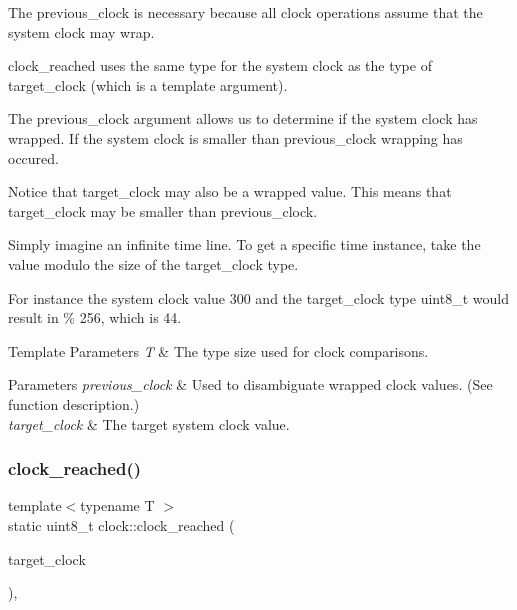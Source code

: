 The previous\+\_\+clock is necessary because all clock operations assume that the system clock may wrap.

clock\+\_\+reached uses the same type for the system clock as the type of target\+\_\+clock (which is a template argument).

The previous\+\_\+clock argument allows us to determine if the system clock has wrapped. If the system clock is smaller than previous\+\_\+clock wrapping has occured.

Notice that target\+\_\+clock may also be a wrapped value. This means that target\+\_\+clock may be smaller than previous\+\_\+clock.

Simply imagine an infinite time line. To get a specific time instance, take the value modulo the size of the target\+\_\+clock type.

For instance the system clock value 300 and the target\+\_\+clock type uint8\+\_\+t would result in { \% 256}, which is 44.


\begin{DoxyTemplParams}{Template Parameters}
{\em T} & The type size used for clock comparisons. \\
\hline
\end{DoxyTemplParams}

\begin{DoxyParams}{Parameters}
{\em previous\+\_\+clock} & Used to disambiguate wrapped clock values. (See function description.) \\
\hline
{\em target\+\_\+clock} & The target system clock value. \\
\hline
\end{DoxyParams}
\hypertarget{namespaceclock_a240d81de9119f92701aa5f26555972c4}{}\label{namespaceclock_a240d81de9119f92701aa5f26555972c4} 
\subsubsection{\texorpdfstring{clock\+\_\+reached()}{clock\_reached()}\hspace{0.1cm}{\footnotesize\ttfamily [3/3]}}
{\footnotesize\ttfamily template$<$typename T $>$ \\
static uint8\+\_\+t clock\+::clock\+\_\+reached (\begin{DoxyParamCaption}\item[{const T \&}]{target\+\_\+clock }\end{DoxyParamCaption})\hspace{0.3cm}{\ttfamily [inline]}, {\ttfamily [static]}}



